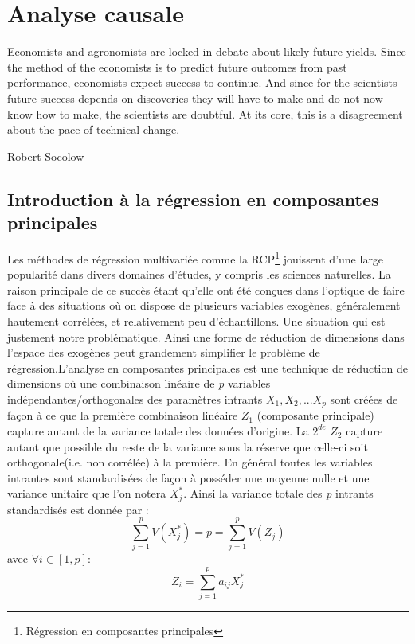 \chapter{Analyse causale}
\epigraph{Economists and agronomists are locked in debate about likely
future yields. Since the method of the economists is to predict
future outcomes from past performance, economists expect
success to continue. And since for the scientists future success
depends on discoveries they will have to make and do not now
know how to make, the scientists are doubtful. At its core, this is
a disagreement about the pace of technical change.}{Robert
Socolow}
\cleardoublepage

	\section{Introduction à la régression en composantes principales}
	Les méthodes de régression multivariée comme la RCP\footnote{Régression en composantes principales} jouissent d'une large popularité dans divers domaines d'études, y compris les sciences naturelles. La raison principale de ce succès étant qu'elle ont été conçues dans l'optique de faire face à des situations où on dispose de plusieurs variables exogènes, généralement hautement corrélées, et relativement peu d'échantillons. Une situation qui est justement notre problématique. Ainsi une forme de réduction de dimensions dans l'espace des exogènes peut grandement simplifier le problème de régression.L'analyse en composantes principales est une technique de réduction de dimensions où une combinaison linéaire de \textit{p} variables indépendantes/orthogonales des paramètres intrants $X_1,X_2,...X_p$ sont créées de façon à ce que la première combinaison linéaire $Z_{1}$ (composante principale) capture autant de la variance totale des données d'origine. La $2^{de}$ $Z_{2}$ capture autant que possible du reste de la variance sous la réserve que celle-ci soit orthogonale(i.e. non corrélée) à la première. En général toutes les variables intrantes sont standardisées de façon à posséder une moyenne nulle et une variance unitaire que l'on notera $X_{j}^{*}$. Ainsi la variance totale des \textit{p} intrants standardisés est donnée par :
	\begin{equation*}
	\sum_{j=1}^{p} V(X_{j}^{*}) = p = \sum_{j=1}^{p}V(Z_{j})
	\end{equation*}
	avec $\forall i \in [1,p]$:
	\begin{equation*}
	Z_i = \sum_{j=1}^{p} a_{ij} X_{j}^{*} 
	\end{equation*}
